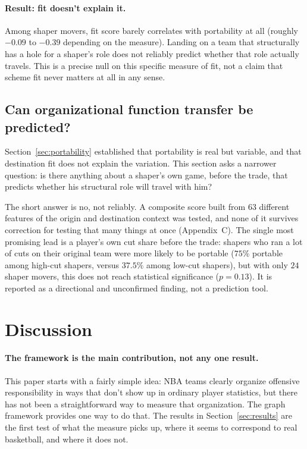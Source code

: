 \documentclass[11pt]{article}
\begin{document}
\paragraph{Result: fit doesn't explain it.}
Among shaper movers, fit score barely correlates with portability at all (roughly $-0.09$
to $-0.39$ depending on the measure). Landing on a team that structurally has a hole for a
shaper's role does not reliably predict whether that role actually travels. This is a
precise null on this specific measure of fit, not a claim that scheme fit never matters at
all in any sense.

\subsection{Can organizational function transfer be predicted?}
\label{sec:travelfit}

Section~\ref{sec:portability} established that portability is real but variable, and that
destination fit does not explain the variation. This section asks a narrower question: is
there anything about a shaper's own game, before the trade, that predicts whether his
structural role will travel with him?

The short answer is no, not reliably. A composite score built from $63$ different features
of the origin and destination context was tested, and none of it survives correction for
testing that many things at once (Appendix~C). The single most promising lead is a
player's own cut share before the trade: shapers who ran a lot of cuts on their original
team were more likely to be portable ($75\%$ portable among high-cut shapers, versus
$37.5\%$ among low-cut shapers), but with only $24$ shaper movers, this does not reach
statistical significance ($p=0.13$). It is reported as a directional and unconfirmed finding,
not a prediction tool.

\section{Discussion}
\label{sec:discussion}

\paragraph{The framework is the main contribution, not any one result.}
This paper starts with a fairly simple idea: NBA teams clearly organize offensive
responsibility in ways that don't show up in ordinary player statistics, but there has not
been a straightforward way to measure that organization. The graph framework provides one way
to do that. The results in Section~\ref{sec:results} are the first test of what the measure
picks up, where it seems to correspond to real basketball, and where it does not.
\end{document}
